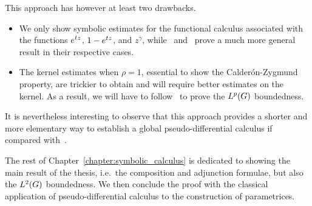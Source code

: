 This approach has however at least two drawbacks.
\begin{itemize}
    \item
        We only show symbolic estimates for the functional calculus associated with the functions $e^{t z}$,
        $1 - e^{t z}$, and $z^\gamma$,
        while~\cite{FischerRuzhansky16} and~\cite{Fischer2015} prove a much more general result in their respective cases.
    \item
        The kernel estimates when $\rho = 1$,
        essential to show the Calder\'on-Zygmund property,
        are trickier to obtain
        and will require better estimates on the kernel.
        As a result,
        we will have to follow~\cite{Fischer2015}
        to prove the ${L^{p} (G)}$ boundedness.
\end{itemize}

It is nevertheless interesting to observe that this approach provides a shorter and more elementary way
to establish a global pseudo-differential calculus
if compared with~\cite{Fischer2015,FischerRuzhansky16}.

The rest of Chapter~\ref{chapter:symbolic_calculus} is dedicated to showing the main result of the thesis,
i.e.\ the composition and adjunction formulae,
but also the ${L^{2} (G)}$ boundedness.
We then conclude the proof with the classical application of pseudo-differential calculus to the construction of parametrices.
